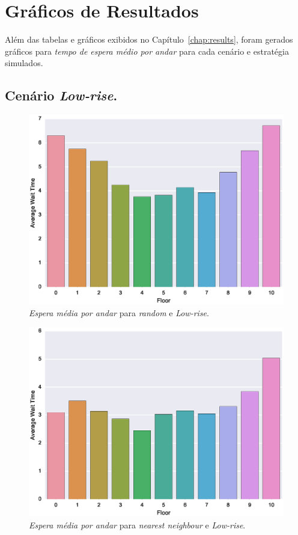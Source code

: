 \chapter{Gráficos de Resultados} \label{app:results}

Além das tabelas e gráficos exibidos no Capítulo~\ref{chap:results}, foram
gerados gráficos para \textit{tempo de espera médio por andar} para cada cenário
e estratégia simulados.

\section{Cenário \textit{Low-rise}.}

\begin{figure}[H]
  \centering
  \includegraphics[scale=0.8]{img/results/Low-rise/1_Simple_Random/averageWaitTime}
  \caption{\textit{Espera média por andar} para \textit{random} e \textit{Low-rise}.}
  \label{fig:result:low-rise:avgwt:random}
\end{figure}

\begin{figure}[H]
  \centering
  \includegraphics[scale=0.8]{img/results/Low-rise/2_Simple_NearestNeighbour/averageWaitTime}
  \caption{\textit{Espera média por andar} para \textit{nearest neighbour} e \textit{Low-rise}.}
  \label{fig:result:low-rise:avgwt:nn}
\end{figure}

